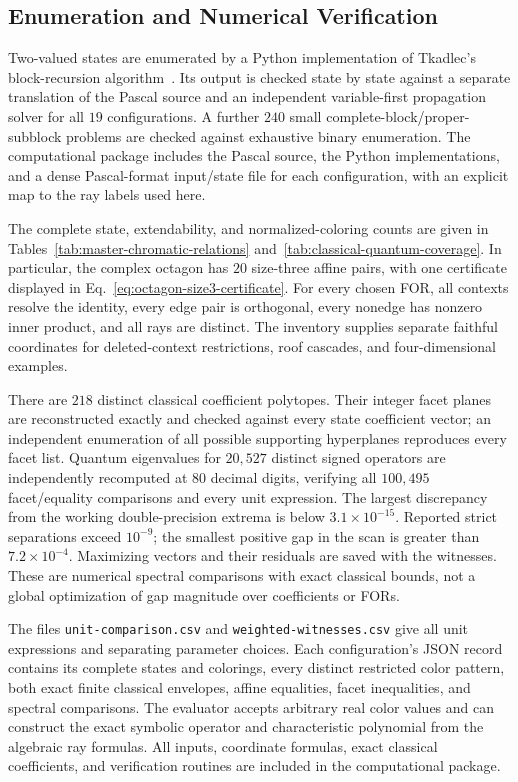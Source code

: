 \documentclass[aps,pra,reprint,superscriptaddress,longbibliography,nofootinbib,floatfix,10pt]{revtex4-2}
\theoremstyle{definition}\newtheorem{definition}[theorem]{Definition}
\theoremstyle{remark}\newtheorem{remark}[theorem]{Remark}
\begin{document}
\subsection{Enumeration and Numerical Verification}

Two-valued states are enumerated by a Python implementation of Tkadlec's block-recursion algorithm~\cite{tkadlec-2states-2017}. Its output is checked state by state against a separate translation of the Pascal source and an independent variable-first propagation solver for all $19$ configurations. A further $240$ small complete-block/proper-subblock problems are checked against exhaustive binary enumeration. The computational package includes the Pascal source, the Python implementations, and a dense Pascal-format input/state file for each configuration, with an explicit map to the ray labels used here.

The complete state, extendability, and normalized-coloring counts are given in Tables~\ref{tab:master-chromatic-relations} and~\ref{tab:classical-quantum-coverage}. In particular, the complex octagon has $20$ size-three affine pairs, with one certificate displayed in Eq.~\eqref{eq:octagon-size3-certificate}. For every chosen FOR, all contexts resolve the identity, every edge pair is orthogonal, every nonedge has nonzero inner product, and all rays are distinct. The inventory supplies separate faithful coordinates for deleted-context restrictions, roof cascades, and four-dimensional examples.

There are $218$ distinct classical coefficient polytopes. Their integer facet planes are reconstructed exactly and checked against every state coefficient vector; an independent enumeration of all possible supporting hyperplanes reproduces every facet list. Quantum eigenvalues for $20{,}527$ distinct signed operators are independently recomputed at $80$ decimal digits, verifying all $100{,}495$ facet/equality comparisons and every unit expression. The largest discrepancy from the working double-precision extrema is below $3.1\times10^{-15}$. Reported strict separations exceed $10^{-9}$; the smallest positive gap in the scan is greater than $7.2\times10^{-4}$. Maximizing vectors and their residuals are saved with the witnesses. These are numerical spectral comparisons with exact classical bounds, not a global optimization of gap magnitude over coefficients or FORs.

The files \texttt{unit-comparison.csv} and \texttt{weighted-witnesses.csv} give all unit expressions and separating parameter choices. Each configuration's JSON record contains its complete states and colorings, every distinct restricted color pattern, both exact finite classical envelopes, affine equalities, facet inequalities, and spectral comparisons. The evaluator accepts arbitrary real color values and can construct the exact symbolic operator and characteristic polynomial from the algebraic ray formulas. All inputs, coordinate formulas, exact classical coefficients, and verification routines are included in the computational package.
\end{document}
